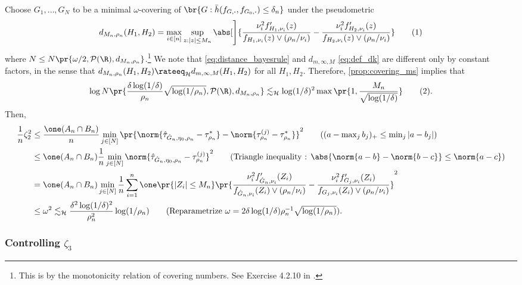 \documentclass[12pt, reqno]{amsart}
\newcommand\numberthis{\addtocounter{equation}{1}\tag{\theequation}}
\newcommand{\fs}[1]{f_{#1, \boldsymbol{\cdot}}}
\newcommand{\barh}{\bar h}
\newcommand{\Hyperparams}{\mathcal{H}}
\newcommand{\leH}{\lesssim_{\mathcal{H}}}
\numberwithin{equation}{section}
\begin{document}
\begin{refsection}
\begin{appendices}
Choose $G_1, \ldots, G_N$ to be a minimal $\omega$-covering of $\br{G : \barh(\fs{G},
\fs{G_0}) \le \delta_n}$ under the pseudometric \[
d_{M_n, \rho_n}(H_1, H_2) = \max_{i\in [n]} \sup_{z : |z| \le M_n} \abs[\Bigg]
{
\frac{\nu_i^2 f'_{H_1, \nu_i}(z)}{f_{H_1, \nu_i}(z) \vee (\rho_n/\nu_i)}
    - \frac{\nu_i^2 f'_{H_2, \nu_i}(z)}{f_{H_2, \nu_i}(z) \vee (\rho_n/\nu_i)}
} \numberthis \label{eq:distance_bayesrule}
\]
where $N \le N\pr{\omega/2, \mathcal P(\R), d_{M_n, \rho_n}}$.\footnote{This is by the
monotonicity relation of covering numbers. See Exercise 4.2.10 in 
\citet{vershynin2018high}.} We note that
\eqref{eq:distance_bayesrule} and $d_{m,\infty, M}$ \eqref{eq:def_dk} are different only
by constant factors, in the sense that $d_{M_n, \rho_n}(H_1, H_2) \rateeq_{\Hyperparams}
 d_{m,\infty, M}(H_1, H_2)$ for all $H_1, H_2$. 
Therefore, \cref{prop:covering_ms} implies that \[
\log N\pr{\frac{\delta \log(1/\delta)}{\rho_n} \sqrt{\log(1/\rho_n)}, \mathcal P(\R), d_
{M_n,
\rho_n}} \leH \log(1/\delta)^2 \max\pr{1, \frac{M_n}{\sqrt{\log (1/\delta)}}} \numberthis
\label{eq:covering_number_bayesrule}.
\]
Then, \begin{align*}
\frac{1}{n} \zeta_2^2 &\le \frac{\one(A_n \cap B_n)}{n} \min_{j\in[N]} \pr{ 
\norm{\hat\tau_ {\hat G_n, \eta_0, \rho_n} - \tau^*_{\rho_n}} - 
    \norm{\tau_{\rho_n}^{(j)} - \tau_{\rho_n}^*} }^2 \tag{$(a-\max_j b_j)_+ \le
    \min_j |a-b_j|$} \\
&\le \one(A_n \cap B_n) \frac{1}{n} \min_{j \in [N]} 
\norm{\hat\tau_
{\hat G_n,
\eta_0, \rho_n} - \tau_{\rho_n}^{(j)}}^2\tag{Triangle inequality :
 $\abs{\norm{a-b} - \norm{b-c}} \le \norm{a-c}$}
 \\
 &= \one(A_n \cap B_n) \min_{j\in [N]} \frac{1}{n} \sum_{i=1}^n \one\pr{|Z_i| \le M_n}\pr
{
\frac{\nu_i^2 f'_{\hat G_n, \nu_i}(Z_i)}{f_{\hat G_n, \nu_i}(Z_i) \vee (\rho_n/\nu_i)}
    - \frac{\nu_i^2 f'_{G_j, \nu_i}(Z_i)}{f_{G_j, \nu_i}(Z_i) \vee (\rho_n/\nu_i)
    }
}^2 \\
&\le \omega^2 \leH \frac{\delta^2 \log(1/\delta)^2}{\rho_n^2} \log(1/\rho_n) \tag{Reparametrize
$\omega = 2\delta \log(1/\delta) \rho_n^{-1} \sqrt{\log(1/\rho_n)}$}.
\end{align*}

\subsubsection{Controlling $\zeta_3$}
\label{sub:zeta_3}


\end{appendices}
\end{refsection}
\end{document}
